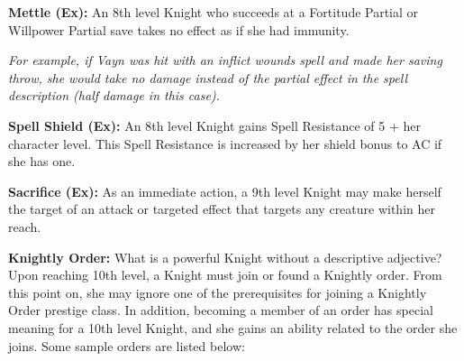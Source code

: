 \documentclass[10pt]{article}
\newcommand{\ability}[2]{\smallskip \noindent \textbf{#1} #2}
\newcommand{\example}[1]{\emph{#1}}
\begin{document}
\ability{Mettle (Ex):}{An 8th level Knight who succeeds at a Fortitude Partial or Willpower Partial save takes no effect as if she had immunity. \smallskip

\example{For example, if Vayn was hit with an inflict wounds spell and made her saving throw, she would take no damage instead of the partial effect in the spell description (half damage in this case).}}

\ability{Spell Shield (Ex):}{An 8th level Knight gains Spell Resistance of 5 + her character level. This Spell Resistance is increased by her shield bonus to AC if she has one.}

\ability{Sacrifice (Ex):}{As an immediate action, a 9th level Knight may make herself the target of an attack or targeted effect that targets any creature within her reach.}

\ability{Knightly Order:}{What is a powerful Knight without a descriptive adjective? Upon reaching 10th level, a Knight must join or found a Knightly order. From this point on, she may ignore one of the prerequisites for joining a Knightly Order prestige class. In addition, becoming a member of an order has special meaning for a 10th level Knight, and she gains an ability related to the order she joins. Some sample orders are listed below:}
\end{document}
